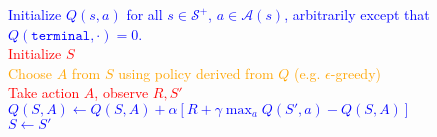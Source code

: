 \documentclass{standalone}
\begin{document}
\pagestyle{empty}
\begin{algorithm}[H]
  \KwInput{Step size $\alpha \in (0, 1]$, and a small $\epsilon > 0$.}
  \textcolor{blue}{Initialize $Q(s,a)$ for all $s \in \mathcal S^+$, $a \in \mathcal A(s)$,   arbitrarily except that $Q(\texttt{terminal}, \cdot) = 0$.\\}
 {
  \textcolor{red}{Initialize $S$} \\
   {
\textcolor{orange}{Choose $A$ from $S$ using policy derived from $Q$ (e.g. $\epsilon$-greedy)} \\
\textcolor{red}{Take action $A$, observe $R, S'$ \\}
\textcolor{blue}{
    $Q(S,A) \gets Q(S,A) + \alpha \left[R + \gamma \max_a Q(S', a) -       Q(S,A)\right]$ \\
    $S \gets S'$}
  }
}
\end{algorithm}
\end{document}
